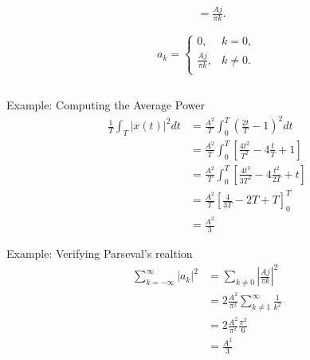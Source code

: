 \begin{frame}
\begin{columns}
\begin{column}{0.5\textwidth}
\begin{align*}
                 &= \frac{Aj}{\pi k}.
            \end{align*}
            \pause
            \begin{equation*}
                a_k = \begin{cases} 0, & k = 0,\\ \frac{Aj}{\pi k},& k \neq 0.\\
                \end{cases}
            \end{equation*}
        \end{column}
    \end{columns}
\end{frame}


\begin{frame}
Example: Computing the Average Power
    \begin{align*}
        \frac{1}{T}\int_T |x(t)|^2dt &= \frac{A^2}{T}\int_0^T  \left(\frac{2t}{T} - 1\right)^2dt\\
        &=  \frac{A^2}{T}\int_0^T  \left[ \frac{4t^2}{T^2} - 4\frac{t}{T} + 1\right]\\
        &=  \frac{A^2}{T}\int_0^T  \left[ \frac{4t^3}{3T^2} - 4\frac{t^2}{2T} + t\right]\\
        &=  \frac{A^2}{T}\left[ \frac{4}{3T} - 2T + T\right]_0^T\\
        &= \frac{A^2}{3}
    \end{align*}
\end{frame}



\begin{frame}
Example: Verifying Parseval's realtion
    \begin{align*}
        \sum_{k=-\infty}^{\infty}|a_k|^2 &= \sum_{k \neq 0}\left|\frac{Aj}{\pi k} \right|^2\\
        &=  2\frac{A^2}{\pi^2}\sum_{k \neq 1}^{\infty}\frac{1}{ k^2}\\
        &= 2\frac{A^2}{\pi^2}\frac{\pi^2}{6}\\
        &= \frac{A^2}{3}        
    \end{align*}
\end{frame}


